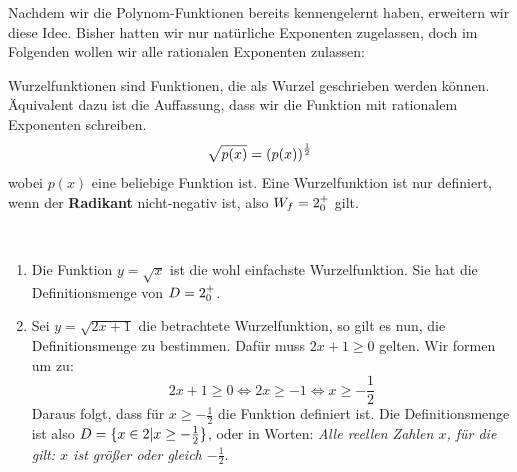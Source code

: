 \documentclass[ngerman, 12pt]{nssheetxea}
\begin{document}
Nachdem wir die Polynom-Funktionen bereits kennengelernt haben, erweitern wir diese Idee. Bisher hatten wir nur natürliche Exponenten zugelassen, doch im Folgenden wollen wir alle rationalen Exponenten zulassen:

\begin{definition}

Wurzelfunktionen sind Funktionen, die als Wurzel geschrieben werden können. Äquivalent dazu ist die Auffassung, dass wir die Funktion mit rationalem Exponenten schreiben.
\[ \sqrt{p(x)} = \mleft( p(x) \mright)^{\frac{1}{2}}  \]
wobei $p(x)$ eine beliebige Funktion ist. Eine Wurzelfunktion ist nur definiert, wenn der \textbf{Radikant} nicht-negativ ist, also $W_f=2^+_0$ gilt. 
  
\end{definition}

\begin{example}
\ 
\begin{enumerate}
\item Die Funktion $y=\sqrt{x}$ ist die wohl einfachste Wurzelfunktion. Sie hat die Definitionsmenge von $D=2_0^+$.

\begin{center}
\end{center}

\item Sei $y=\sqrt{2x+1}$ die betrachtete Wurzelfunktion, so gilt es nun, die Definitionsmenge zu bestimmen. Dafür muss $2x+1\geq 0$ gelten. Wir formen um zu:
\[ 2x+1\geq 0 \Leftrightarrow 2x \geq -1 \Leftrightarrow x \geq - \frac{1}{2}  \]
Daraus folgt, dass für $x\geq - \frac{1}{2}$ die Funktion definiert ist. Die Definitionsmenge ist also $D=\{ x \in 2 | x \geq - \frac{1}{2}   \}$, oder in Worten: \textit{Alle reellen Zahlen $x$, für die gilt: $x$ ist größer oder gleich $-\frac{1}{2}$}.

\begin{center}
\end{center}
\end{enumerate}

\end{example}
\end{document}
